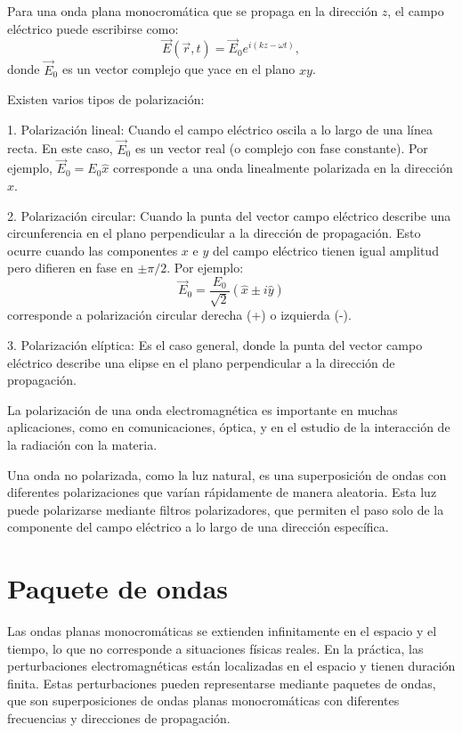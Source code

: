 \documentclass[12pt,a4paper]{book}
\begin{document}
Para una onda plana monocromática que se propaga en la dirección $z$, el campo eléctrico puede escribirse como:
\begin{equation}
\vec{E}(\vec{r}, t) = \vec{E}_0 e^{i(kz - \omega t)},
\end{equation}
donde $\vec{E}_0$ es un vector complejo que yace en el plano $xy$.

Existen varios tipos de polarización:

1. Polarización lineal: Cuando el campo eléctrico oscila a lo largo de una línea recta. En este caso, $\vec{E}_0$ es un vector real (o complejo con fase constante). Por ejemplo, $\vec{E}_0 = E_0 \hat{x}$ corresponde a una onda linealmente polarizada en la dirección $x$.

2. Polarización circular: Cuando la punta del vector campo eléctrico describe una circunferencia en el plano perpendicular a la dirección de propagación. Esto ocurre cuando las componentes $x$ e $y$ del campo eléctrico tienen igual amplitud pero difieren en fase en $\pm \pi/2$. Por ejemplo:
   \begin{equation}
   \vec{E}_0 = \frac{E_0}{\sqrt{2}}(\hat{x} \pm i\hat{y})
   \end{equation}
   corresponde a polarización circular derecha (+) o izquierda (-).

3. Polarización elíptica: Es el caso general, donde la punta del vector campo eléctrico describe una elipse en el plano perpendicular a la dirección de propagación.

La polarización de una onda electromagnética es importante en muchas aplicaciones, como en comunicaciones, óptica, y en el estudio de la interacción de la radiación con la materia.

Una onda no polarizada, como la luz natural, es una superposición de ondas con diferentes polarizaciones que varían rápidamente de manera aleatoria. Esta luz puede polarizarse mediante filtros polarizadores, que permiten el paso solo de la componente del campo eléctrico a lo largo de una dirección específica.

\section{Paquete de ondas}

Las ondas planas monocromáticas se extienden infinitamente en el espacio y el tiempo, lo que no corresponde a situaciones físicas reales. En la práctica, las perturbaciones electromagnéticas están localizadas en el espacio y tienen duración finita. Estas perturbaciones pueden representarse mediante paquetes de ondas, que son superposiciones de ondas planas monocromáticas con diferentes frecuencias y direcciones de propagación.
\end{document}
